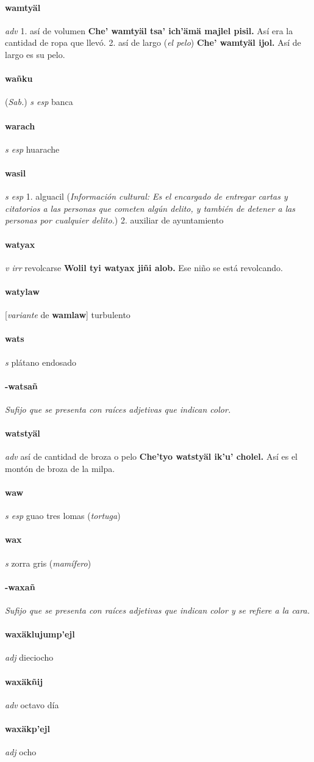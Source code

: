 \documentclass{scrbook}
\newcommand{\entry}[1]{\paragraph{#1}}
\newcommand{\onedefinition}[1]{#1.}
\newcommand{\nontranslationdef}[1]{\textit{#1}}
\newcommand{\partofspeech}[1]{\textit{#1}}
\newcommand{\spanishtranslation}[1]{#1}
\newcommand{\clarification}[1]{(\textit{#1})}
\newcommand{\cholexample}[1]{\textbf{#1}}
\newcommand{\exampletranslation}[1]{#1}
\newcommand{\relevantdialect}[1]{(\textit{#1})}
\newcommand{\culturalinformation}[1]{(\textit{#1})}
\newcommand{\conjugationtense}[1]{[\textit{#1}}
\newcommand{\conjugationverb}[1]{de \textbf{#1}]}
\begin{document}
\begin{multicols}{2}
\entry{wamtyäl}
\partofspeech{adv}
\onedefinition{1}
\spanishtranslation{así de volumen}
\cholexample{Che' wamtyäl tsa' ich'ämä majlel pisil.}
\exampletranslation{Así era la cantidad de ropa que llevó.}
\onedefinition{2}
\spanishtranslation{así de largo}
\clarification{el pelo}
\cholexample{Che' wamtyäl ijol.}
\exampletranslation{Así de largo es su pelo.}

\entry{wañku}
\relevantdialect{Sab.}
\partofspeech{s esp}
\spanishtranslation{banca}

\entry{warach}
\partofspeech{s esp}
\spanishtranslation{huarache}

\entry{wasil}
\partofspeech{s esp}
\onedefinition{1}
\spanishtranslation{alguacil}
\culturalinformation{Información cultural: Es el encargado de entregar cartas y citatorios a las personas que cometen algún delito, y también de detener a las personas por cualquier delito.}
\onedefinition{2}
\spanishtranslation{auxiliar de ayuntamiento}

\entry{watyax}
\partofspeech{v irr}
\spanishtranslation{revolcarse}
\cholexample{Wolil tyi watyax jiñi alob.}
\exampletranslation{Ese niño se está revolcando.}

\entry{watylaw}
\conjugationtense{variante}
\conjugationverb{wamlaw}
\spanishtranslation{turbulento}

\entry{wats}
\partofspeech{s}
\spanishtranslation{plátano endosado}

\entry{-watsañ}
\nontranslationdef{Sufijo que se presenta con raíces adjetivas que indican color.}

\entry{watstyäl}
\partofspeech{adv}
\spanishtranslation{así de cantidad de broza o pelo}
\cholexample{Che'tyo watstyäl ik'u' cholel.}
\exampletranslation{Así es el montón de broza de la milpa.}

\entry{waw}
\partofspeech{s esp}
\spanishtranslation{guao}
\spanishtranslation{tres lomas}
\clarification{tortuga}

\entry{wax}
\partofspeech{s}
\spanishtranslation{zorra gris}
\clarification{mamífero}

\entry{-waxañ}
\nontranslationdef{Sufijo que se presenta con raíces adjetivas que indican color y se refiere a la cara.}

\entry{waxäklujump'ejl}
\partofspeech{adj}
\spanishtranslation{dieciocho}

\entry{waxäkñij}
\partofspeech{adv}
\spanishtranslation{octavo día}

\entry{waxäkp'ejl}
\partofspeech{adj}
\spanishtranslation{ocho}


\end{multicols}
\end{document}
